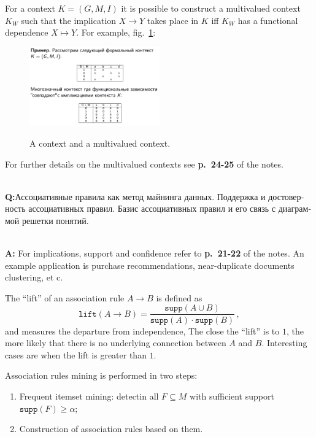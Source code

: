 \documentclass[a4paper]{article}
\newcommand{\rus}[1]{\foreignlanguage{russian}{#1}}
\begin{document}
For a context $K=(G, M, I)$ it is possible to construct a multivalued context
$K_W$ such that the implication $X\to Y$ takes place in $K$ iff $K_W$ has a functional
dependence $X\mapsto Y$. For example, fig.~\ref{fig:multivalued}:
\begin{figure}
    \centering
    \includegraphics[width=0.5\textwidth]{multivalued.png}
    \label{fig:multivalued}
    \caption{A context and a multivalued context.}
\end{figure}
For further details on the multivalued contexts see \textbf{p.~24-25} of the notes.

\hfill\\\textbf{Q:}\rus{Ассоциативные правила как метод майнинга данных. Поддержка
и достоверность ассоциативных правил. Базис ассоциативных правил и его связь с диаграммой
решетки понятий.}

\hfill\\\textbf{A:}
For implications, support and confidence refer to \textbf{p.~21-22} of the notes.
An example application is purchase recommendations, near-duplicate documents clustering,
et c.

The ``lift'' of an association rule $A\to B$ is defined as 
$$ \mathtt{lift}(A\to B)
    = \frac{\mathtt{supp}(A\cup B)}{\mathtt{supp}(A)\cdot \mathtt{supp}(B)}
    \,, $$
and measures the departure from independence, The close the ``lift'' is to $1$,
the more likely that there is no underlying connection between $A$ and $B$. Interesting
cases are when the lift is greater than $1$. 

Association rules mining is performed in two steps: \begin{enumerate}
    \item Frequent itemset mining: detectin all $F \subseteq M$ with sufficient
    support $\mathtt{supp}(F)\geq \alpha$;
    \item Construction of association rules based on them.
\end{enumerate}
\end{document}
